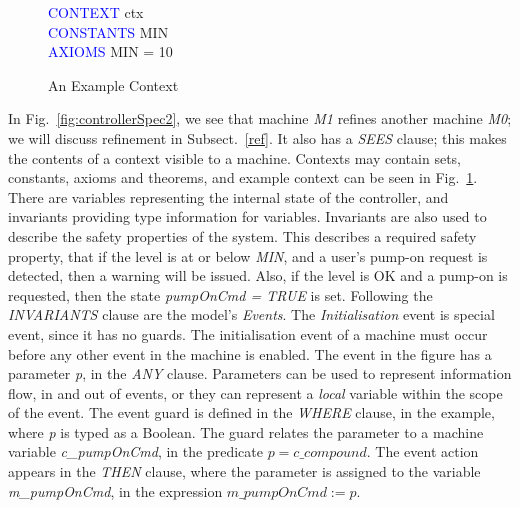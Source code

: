 %
%
%
\begin{figure}[b]
\centering
\begin{minipage}{0.3\textwidth}
\textcolor{blue}{CONTEXT} ctx  \\
\textcolor{blue}{CONSTANTS} MIN\\
\textcolor{blue}{AXIOMS} MIN = 10
\end{minipage}
\caption{An Example Context}
\label{fig:context}
\end{figure}
%
%
 In Fig.~\ref{fig:controllerSpec2}, we see that machine \emph{M1} refines another machine \emph{M0}; we will discuss refinement in Subsect.~\ref{ref}. It also has a \emph{SEES} clause; this makes the contents of a context visible to a machine. Contexts may contain sets, constants, axioms and theorems, and example context can be seen in Fig.~\ref{fig:context}. There are variables representing the internal state of the controller, and invariants providing type information for variables. Invariants are also used to describe the safety properties of the system. This describes a required safety property, that if the level is at or below \emph{MIN}, and a user's pump-on request is detected, then a warning will be issued. Also, if the level is OK and a pump-on is requested, then the state \emph{pumpOnCmd = TRUE} is  set.  Following the \emph{INVARIANTS} clause are the model's \emph{Events}. The \emph{Initialisation} event is special event, since it has no guards. The initialisation event of a machine must occur before any other event in the machine is enabled. The event in the figure has a parameter \emph{p}, in the \emph{ANY} clause. Parameters can be used to represent information flow, in and out of events, or they can represent a \emph{local} variable within the scope of the event. The event guard is defined in the \emph{WHERE} clause, in the example, where \emph{p} is typed as a Boolean. The guard relates the parameter to a machine variable \emph{c\_pumpOnCmd}, in the predicate $ p = c\_compound$. The event action appears in the \emph{THEN} clause, where the parameter is assigned to the variable \emph{m\_pumpOnCmd}, in the expression $m\_pumpOnCmd := p$.


